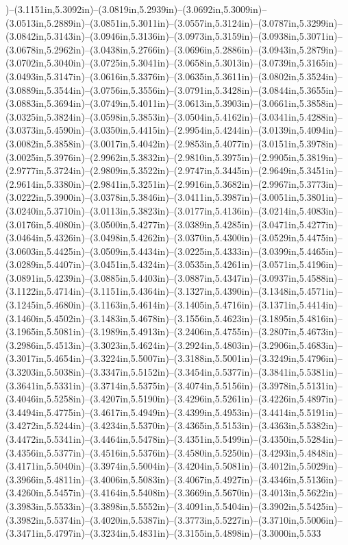 )--(3.1151in,5.3092in)--(3.0819in,5.2939in)--(3.0692in,5.3009in)--(3.0513in,5.2889in)--(3.0851in,5.3011in)--(3.0557in,5.3124in)--(3.0787in,5.3299in)--(3.0842in,5.3143in)--(3.0946in,5.3136in)--(3.0973in,5.3159in)--(3.0938in,5.3071in)--(3.0678in,5.2962in)--(3.0438in,5.2766in)--(3.0696in,5.2886in)--(3.0943in,5.2879in)--(3.0702in,5.3040in)--(3.0725in,5.3041in)--(3.0658in,5.3013in)--(3.0739in,5.3165in)--(3.0493in,5.3147in)--(3.0616in,5.3376in)--(3.0635in,5.3611in)--(3.0802in,5.3524in)--(3.0889in,5.3544in)--(3.0756in,5.3556in)--(3.0791in,5.3428in)--(3.0844in,5.3655in)--(3.0883in,5.3694in)--(3.0749in,5.4011in)--(3.0613in,5.3903in)--(3.0661in,5.3858in)--(3.0325in,5.3824in)--(3.0598in,5.3853in)--(3.0504in,5.4162in)--(3.0341in,5.4288in)--(3.0373in,5.4590in)--(3.0350in,5.4415in)--(2.9954in,5.4244in)--(3.0139in,5.4094in)--(3.0082in,5.3858in)--(3.0017in,5.4042in)--(2.9853in,5.4077in)--(3.0151in,5.3978in)--(3.0025in,5.3976in)--(2.9962in,5.3832in)--(2.9810in,5.3975in)--(2.9905in,5.3819in)--(2.9777in,5.3724in)--(2.9809in,5.3522in)--(2.9747in,5.3445in)--(2.9649in,5.3451in)--(2.9614in,5.3380in)--(2.9841in,5.3251in)--(2.9916in,5.3682in)--(2.9967in,5.3773in)--(3.0222in,5.3900in)--(3.0378in,5.3846in)--(3.0411in,5.3987in)--(3.0051in,5.3801in)--(3.0240in,5.3710in)--(3.0113in,5.3823in)--(3.0177in,5.4136in)--(3.0214in,5.4083in)--(3.0176in,5.4080in)--(3.0500in,5.4277in)--(3.0389in,5.4285in)--(3.0471in,5.4277in)--(3.0464in,5.4326in)--(3.0498in,5.4262in)--(3.0370in,5.4300in)--(3.0529in,5.4475in)--(3.0603in,5.4425in)--(3.0509in,5.4434in)--(3.0225in,5.4333in)--(3.0399in,5.4465in)--(3.0289in,5.4407in)--(3.0451in,5.4324in)--(3.0535in,5.4261in)--(3.0571in,5.4196in)--(3.0891in,5.4239in)--(3.0885in,5.4403in)--(3.0887in,5.4347in)--(3.0937in,5.4588in)--(3.1122in,5.4714in)--(3.1151in,5.4364in)--(3.1327in,5.4390in)--(3.1348in,5.4571in)--(3.1245in,5.4680in)--(3.1163in,5.4614in)--(3.1405in,5.4716in)--(3.1371in,5.4414in)--(3.1460in,5.4502in)--(3.1483in,5.4678in)--(3.1556in,5.4623in)--(3.1895in,5.4816in)--(3.1965in,5.5081in)--(3.1989in,5.4913in)--(3.2406in,5.4755in)--(3.2807in,5.4673in)--(3.2986in,5.4513in)--(3.3023in,5.4624in)--(3.2924in,5.4803in)--(3.2906in,5.4683in)--(3.3017in,5.4654in)--(3.3224in,5.5007in)--(3.3188in,5.5001in)--(3.3249in,5.4796in)--(3.3203in,5.5038in)--(3.3347in,5.5152in)--(3.3454in,5.5377in)--(3.3841in,5.5381in)--(3.3641in,5.5331in)--(3.3714in,5.5375in)--(3.4074in,5.5156in)--(3.3978in,5.5131in)--(3.4046in,5.5258in)--(3.4207in,5.5190in)--(3.4296in,5.5261in)--(3.4226in,5.4897in)--(3.4494in,5.4775in)--(3.4617in,5.4949in)--(3.4399in,5.4953in)--(3.4414in,5.5191in)--(3.4272in,5.5244in)--(3.4234in,5.5370in)--(3.4365in,5.5153in)--(3.4363in,5.5382in)--(3.4472in,5.5341in)--(3.4464in,5.5478in)--(3.4351in,5.5499in)--(3.4350in,5.5284in)--(3.4356in,5.5377in)--(3.4516in,5.5376in)--(3.4580in,5.5250in)--(3.4293in,5.4848in)--(3.4171in,5.5040in)--(3.3974in,5.5004in)--(3.4204in,5.5081in)--(3.4012in,5.5029in)--(3.3966in,5.4811in)--(3.4006in,5.5083in)--(3.4067in,5.4927in)--(3.4346in,5.5136in)--(3.4260in,5.5457in)--(3.4164in,5.5408in)--(3.3669in,5.5670in)--(3.4013in,5.5622in)--(3.3983in,5.5533in)--(3.3898in,5.5552in)--(3.4091in,5.5404in)--(3.3902in,5.5425in)--(3.3982in,5.5374in)--(3.4020in,5.5387in)--(3.3773in,5.5227in)--(3.3710in,5.5006in)--(3.3471in,5.4797in)--(3.3234in,5.4831in)--(3.3155in,5.4898in)--(3.3000in,5.533